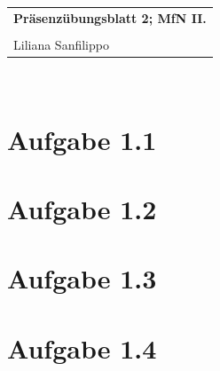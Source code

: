 \documentclass{article} %
\newcommand{\titulo}{Präsenzübungsblatt 2; MfN II.}
\newcommand{\nombre}{Liliana Sanfilippo}
\begin{document}
\begin{tabular}{p{12cm}}
{{\Large\bf\titulo}}\\
\vspace{0.2cm}\\
 {\large\nombre}\\
\end{tabular}
\vspace{0.2cm}\\
\section{Aufgabe 1.1}

\section{Aufgabe 1.2}

\section{Aufgabe 1.3}

\section{Aufgabe 1.4}
\end{document}
